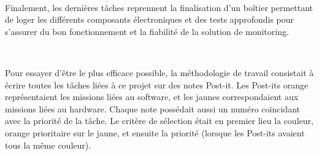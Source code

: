 ~

\noindent
Finalement, les dernières tâches reprennent la finalisation d'un boîtier permettant de loger les différents composants électroniques et des tests approfondis pour s'assurer du bon fonctionnement et la fiabilité de la solution de monitoring.

~

\noindent
Pour essayer d'être le plus efficace possible, la méthodologie de travail consistait à écrire toutes les tâches liées à ce projet sur des notes Post-it. Les Post-its orange représentaient les missions liées au software, et les jaunes correspondaient aux missions liées au hardware. Chaque note possédait aussi un numéro coïncidant avec la priorité de la tâche. Le critère de sélection était en premier lieu la couleur, orange prioritaire sur le jaune, et ensuite la priorité (lorsque les Post-its avaient tous la même couleur).
